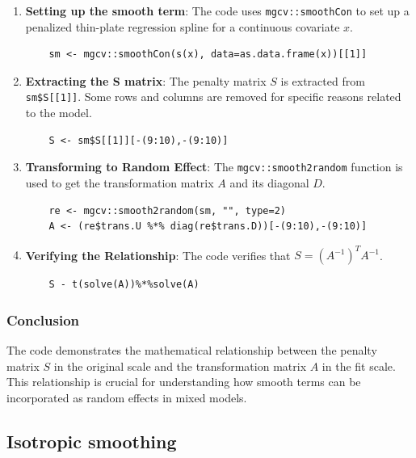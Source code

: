 \documentclass[12pt, twoside,hidelinks]{article}
\theoremstyle{definition}
\numberwithin{equation}{section}
\begin{document}
\begin{enumerate}
    \item \textbf{Setting up the smooth term}: The code uses \texttt{mgcv::smoothCon} to set up a penalized thin-plate regression spline for a continuous covariate \( x \).
    \begin{verbatim}
    sm <- mgcv::smoothCon(s(x), data=as.data.frame(x))[[1]]
    \end{verbatim}

    \item \textbf{Extracting the S matrix}: The penalty matrix \( S \) is extracted from \texttt{sm\$S[[1]]}. Some rows and columns are removed for specific reasons related to the model.
    \begin{verbatim}
    S <- sm$S[[1]][-(9:10),-(9:10)]
    \end{verbatim}

    \item \textbf{Transforming to Random Effect}: The \texttt{mgcv::smooth2random} function is used to get the transformation matrix \( A \) and its diagonal \( D \).
    \begin{verbatim}
    re <- mgcv::smooth2random(sm, "", type=2)
    A <- (re$trans.U %*% diag(re$trans.D))[-(9:10),-(9:10)]
    \end{verbatim}

    \item \textbf{Verifying the Relationship}: The code verifies that \( S = (A^{-1})^T A^{-1} \).
    \begin{verbatim}
    S - t(solve(A))%*%solve(A)
    \end{verbatim}
\end{enumerate}

\subsubsection{Conclusion}

The code demonstrates the mathematical relationship between the penalty matrix \( S \) in the original scale and the transformation matrix \( A \) in the fit scale. This relationship is crucial for understanding how smooth terms can be incorporated as random effects in mixed models.


\subsection{Isotropic smoothing}
\end{document}
